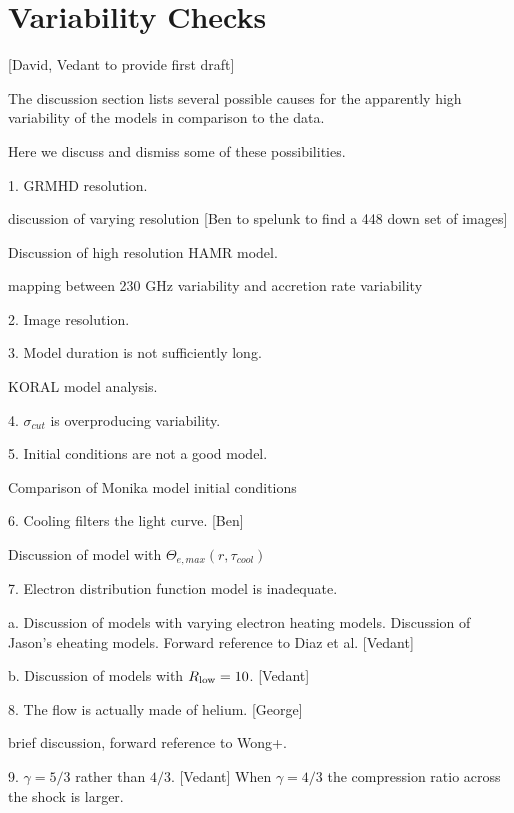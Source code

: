 \section{Variability Checks}\label{app:numerical}

[David, Vedant to provide first draft]

The discussion section lists several possible causes for the apparently high variability of the models in comparison to the data.

Here we discuss and dismiss some of these possibilities.

1. GRMHD resolution.

discussion of varying resolution [Ben to spelunk to find a 448 down set of images]

Discussion of high resolution HAMR model.

mapping between 230 GHz variability and accretion rate variability

2. Image resolution.

3. Model duration is not sufficiently long.

KORAL model analysis.

4. $\sigma_{cut}$ is overproducing variability.

5. Initial conditions are not a good model. 

Comparison of Monika model initial conditions

6. Cooling filters the light curve. [Ben]

Discussion of model with $\Theta_{e,max}(r, \tau_{cool})$

7. Electron distribution function model is inadequate. 

a.  Discussion of models with varying electron heating models.  Discussion of Jason's eheating models.   Forward reference to Diaz et al.  [Vedant]

b. Discussion of models with $R_\mathrm{low} = 10$. [Vedant]

8. The flow is actually made of helium. [George]

brief discussion, forward reference to Wong+.

9. $\gamma = 5/3$ rather than $4/3$.   [Vedant]  When $\gamma = 4/3$ the compression ratio across the shock is larger.

